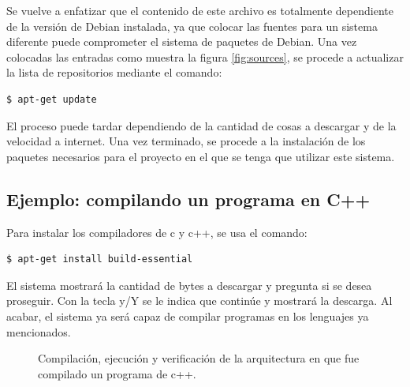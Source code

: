 Se vuelve a enfatizar que el contenido de este archivo es totalmente dependiente de la versión de Debian instalada, ya que colocar las fuentes para un sistema diferente puede comprometer el sistema de paquetes de Debian. Una vez colocadas las entradas como muestra la figura \ref{fig:sources}, se procede a actualizar la lista de repositorios mediante el comando:

\begin{lstlisting}[language=bash]
$ apt-get update
\end{lstlisting}

El proceso puede tardar dependiendo de la cantidad de cosas a descargar y de la velocidad a internet. Una vez terminado, se procede a la instalación de los paquetes necesarios para el proyecto en el que se tenga que utilizar este sistema. 

\subsection{Ejemplo: compilando un programa en C++}
Para instalar los compiladores de c y c++, se usa el comando:

\begin{lstlisting}[language=bash]
$ apt-get install build-essential
\end{lstlisting}

El sistema mostrará la cantidad de bytes a descargar y pregunta si se desea proseguir. Con la tecla y/Y se le indica que continúe y mostrará la descarga. Al acabar, el sistema ya será capaz de compilar programas en los lenguajes ya mencionados.

\begin{figure}[H] %
\caption{Compilación, ejecución y verificación de la arquitectura en que fue compilado un programa de c++.}
\label{fig:hola}
\end{figure}

